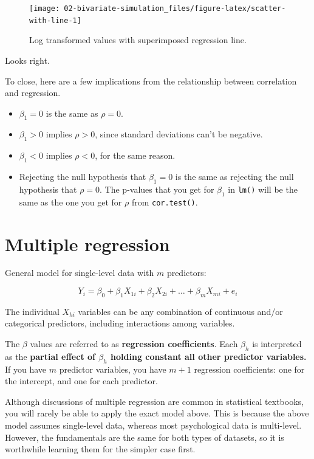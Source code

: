 \documentclass[]{book}
\providecommand{\tightlist}{%
  \setlength{\itemsep}{0pt}\setlength{\parskip}{0pt}}
\begin{document}
\begin{figure}

{\centering \texttt{[image: 02-bivariate-simulation\_files/figure-latex/scatter-with-line-1]} 

}

\caption{Log transformed values with superimposed regression line.}\label{fig:scatter-with-line}
\end{figure}

Looks right.

To close, here are a few implications from the relationship between correlation and regression.

\begin{itemize}
\tightlist
\item
  \(\beta_1 = 0\) is the same as \(\rho = 0\).
\item
  \(\beta_1 > 0\) implies \(\rho > 0\), since standard deviations can't be negative.
\item
  \(\beta_1 < 0\) implies \(\rho < 0\), for the same reason.
\item
  Rejecting the null hypothesis that \(\beta_1 = 0\) is the same as rejecting the null hypothesis that \(\rho = 0\). The p-values that you get for \(\beta_1\) in \texttt{lm()} will be the same as the one you get for \(\rho\) from \texttt{cor.test()}.
\end{itemize}

\hypertarget{multiple-regression}{%
\chapter{Multiple regression}\label{multiple-regression}}

General model for single-level data with \(m\) predictors:

\[
Y_i = \beta_0 + \beta_1 X_{1i} + \beta_2 X_{2i} + \ldots + \beta_m X_{mi} + e_i
\]

The individual \(X_{hi}\) variables can be any combination of continuous and/or categorical predictors, including interactions among variables.

The \(\beta\) values are referred to as \textbf{regression coefficients}. Each \(\beta_h\) is interpreted as the \textbf{partial effect of \(\beta_h\) holding constant all other predictor variables.} If you have \(m\) predictor variables, you have \(m+1\) regression coefficients: one for the intercept, and one for each predictor.

Although discussions of multiple regression are common in statistical textbooks, you will rarely be able to apply the exact model above. This is because the above model assumes single-level data, whereas most psychological data is multi-level. However, the fundamentals are the same for both types of datasets, so it is worthwhile learning them for the simpler case first.
\end{document}
